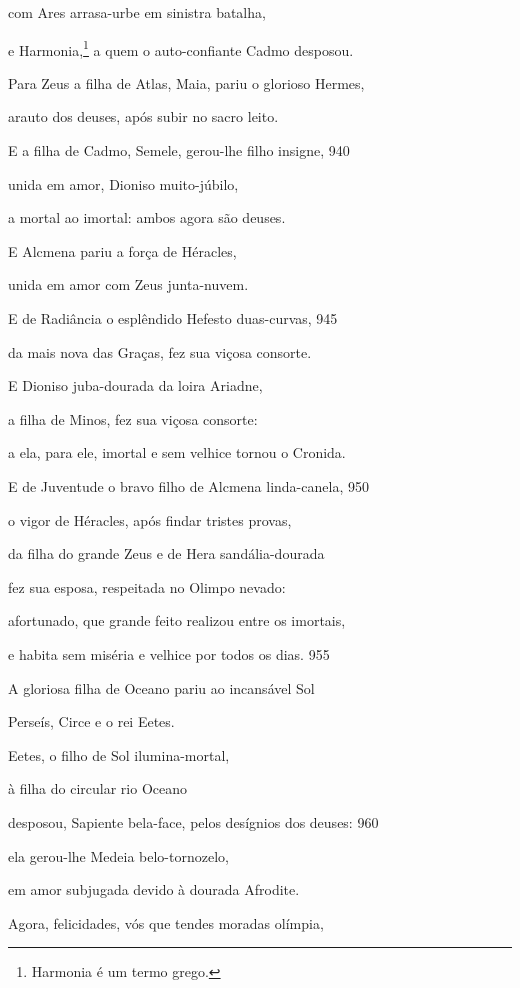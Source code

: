 com Ares arrasa-urbe em sinistra batalha,

e Harmonia,\footnote{Harmonia é um termo grego.} a quem o auto-confiante Cadmo desposou.

\quad{}Para Zeus a filha de Atlas, Maia, pariu o glorioso Hermes,

arauto dos deuses, após subir no sacro leito.

\quad{}E a filha de Cadmo, Semele, gerou-lhe filho insigne, \num{940}

unida em amor, Dioniso muito-júbilo,

a mortal ao imortal: ambos agora são deuses.

\quad{}E Alcmena pariu a força de Héracles,

unida em amor com Zeus junta-nuvem.

\quad{}E de Radiância o esplêndido Hefesto duas-curvas, \num{945}

da mais nova das Graças, fez sua viçosa consorte.

\quad{}E Dioniso juba-dourada da loira Ariadne,

a filha de Minos, fez sua viçosa consorte:

a ela, para ele, imortal e sem velhice tornou o Cronida.

\quad{}E de Juventude o bravo filho de Alcmena linda-canela, \num{950}

o vigor de Héracles, após findar tristes provas,

da filha do grande Zeus e de Hera sandália-dourada

fez sua esposa, respeitada no Olimpo nevado:

afortunado, que grande feito realizou entre os imortais,

e habita sem miséria e velhice por todos os dias. \num{955}

\quad{}A gloriosa filha de Oceano pariu ao incansável Sol

Perseís, Circe e o rei Eetes.

Eetes, o filho de Sol ilumina-mortal,

à filha do circular rio Oceano

desposou, Sapiente bela-face, pelos desígnios dos deuses: \num{960}

ela gerou-lhe Medeia belo-tornozelo,

em amor subjugada devido à dourada Afrodite.

\medskip

Agora, felicidades, vós que tendes moradas olímpia,

